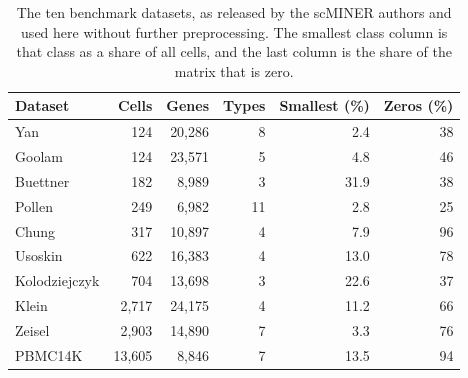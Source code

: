 \begin{table}[t]
\centering
\caption{The ten benchmark datasets, as released by the scMINER authors and used here without further preprocessing. The smallest class column is that class as a share of all cells, and the last column is the share of the matrix that is zero.}
\label{tab:data}
\footnotesize
\setlength{\tabcolsep}{4pt}
\begin{tabular}{lrrrrr}
\toprule
Dataset & Cells & Genes & Types & Smallest (\%) & Zeros (\%) \\
\midrule
Yan & 124 & 20,286 & 8 & 2.4 & 38 \\
Goolam & 124 & 23,571 & 5 & 4.8 & 46 \\
Buettner & 182 & 8,989 & 3 & 31.9 & 38 \\
Pollen & 249 & 6,982 & 11 & 2.8 & 25 \\
Chung & 317 & 10,897 & 4 & 7.9 & 96 \\
Usoskin & 622 & 16,383 & 4 & 13.0 & 78 \\
Kolodziejczyk & 704 & 13,698 & 3 & 22.6 & 37 \\
Klein & 2,717 & 24,175 & 4 & 11.2 & 66 \\
Zeisel & 2,903 & 14,890 & 7 & 3.3 & 76 \\
PBMC14K & 13,605 & 8,846 & 7 & 13.5 & 94 \\
\bottomrule
\end{tabular}
\end{table}
